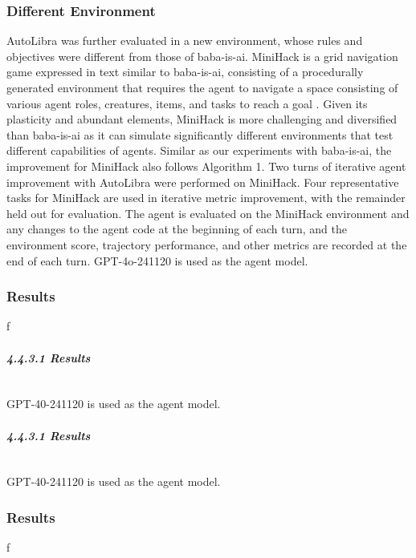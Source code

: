 \subsubsection{Different Environment}

AutoLibra was further evaluated in a new environment, whose rules and objectives were different from those of baba-is-ai. MiniHack is a grid navigation game expressed in text similar to baba-is-ai, consisting of a procedurally generated environment that requires the agent to navigate a space consisting of various agent roles, creatures, items, and tasks to reach a goal \cite{samvelyan2021minihackplanetsandboxopenended}. Given its plasticity and abundant elements, MiniHack is more challenging and diversified than baba-is-ai as it can simulate significantly different environments that test different capabilities of agents. Similar as our experiments with baba-is-ai, the improvement for MiniHack also follows Algorithm 1. Two turns of iterative agent improvement with AutoLibra were performed on MiniHack. Four representative tasks for MiniHack are used in iterative metric improvement, with the remainder held out for evaluation. The agent is evaluated on the MiniHack environment and any changes to the agent code at the beginning of each turn, and the environment score, trajectory performance, and other metrics are recorded at the end of each turn. GPT-4o-241120 is used as the agent model.

\label{tab:metrics_mini}

\subsubsection{Results}

f

\paragraph{\textit{4.4.3.1 Results}}~\newline 
\\GPT-40-241120 is used as the agent model.
\paragraph{\textit{4.4.3.1 Results}}~\newline 
\\GPT-40-241120 is used as the agent model.

\subsubsection{Results}

f

